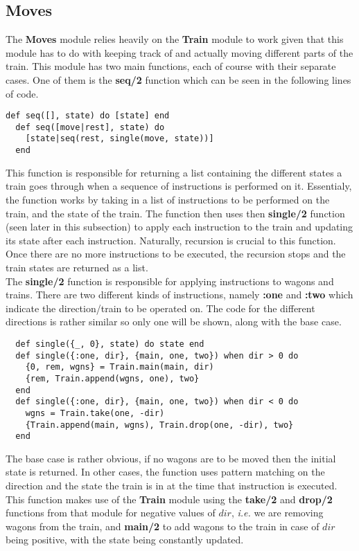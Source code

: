 \documentclass[a4paper,11pt]{article}
\begin{document}
\subsection*{
	\textbf{Moves}
}
The \textbf{Moves} module relies heavily on the \textbf{Train} module to work given that this module has to do with keeping track of and actually moving different parts of the train. This module has two main functions, each of course with their separate cases. One of them is the \textbf{seq/2} function which can be seen in the following lines of code.
\begin{verbatim}
def seq([], state) do [state] end
  def seq([move|rest], state) do
    [state|seq(rest, single(move, state))]
  end
  \end{verbatim}
This function is responsible for returning a list containing the different states a train goes through when a sequence of instructions is performed on it. Essentialy, the function works by taking in a list of instructions to be performed on the train, and the state of the train. The function then uses then \textbf{single/2} function (seen later in this subsection) to apply each instruction to the train and updating its state after each instruction. Naturally, recursion is crucial to this function. Once there are no more instructions to be executed, the recursion stops and the train states are returned as a list.\\

 The \textbf{single/2} function is responsible for applying instructions to wagons and trains. There are two different kinds of instructions, namely \textbf{:one} and \textbf{:two} which indicate the direction/train to be operated on. The code for the different directions is rather similar so only one will be shown, along with the base case.
 \begin{verbatim}
  def single({_, 0}, state) do state end
  def single({:one, dir}, {main, one, two}) when dir > 0 do
    {0, rem, wgns} = Train.main(main, dir)
    {rem, Train.append(wgns, one), two}
  end
  def single({:one, dir}, {main, one, two}) when dir < 0 do
    wgns = Train.take(one, -dir)
    {Train.append(main, wgns), Train.drop(one, -dir), two}
  end
\end{verbatim}
The base case is rather obvious, if no wagons are to be moved then the initial state is returned. In other cases, the function uses pattern matching on the direction and the state the train is in at the time that instruction is executed. This function makes use of the \textbf{Train} module using the \textbf{take/2} and \textbf{drop/2} functions from that module for negative values of $dir$, \textit{i.e.} we are removing wagons from the train, and \textbf{main/2} to add wagons to the train in case of $dir$ being positive, with the state being constantly updated.
\end{document}

